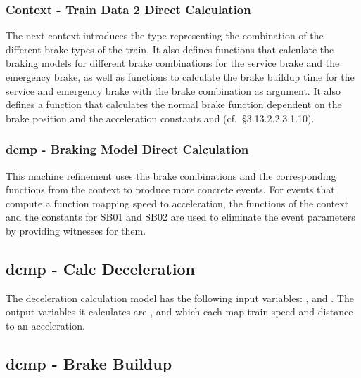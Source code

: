 \documentclass{template/openetcs_article}
\begin{document}
{\footnotesize

}

\subsubsection{Context - Train Data 2 Direct Calculation}
\label{sec:context-train-data-1}

The next context introduces the type representing the combination of the
different brake types of the train. It also defines functions that calculate the
braking models for different brake combinations for the service brake and the
emergency brake, as well as functions to calculate the brake buildup time for
the service and emergency brake with the brake combination as argument. It also
defines a function that calculates the normal brake function dependent on the
brake position and the acceleration constants  and
 (cf.~§3.13.2.2.3.1.10).

{\footnotesize

}

\subsubsection{dcmp - Braking Model Direct Calculation}
\label{sec:dcmp-braking-model-2}

This machine refinement uses the brake combinations and the corresponding
functions from the context to produce more concrete events. For events that
compute a function mapping speed to acceleration, the functions of the context
and the constants for SB01 and SB02 are used to eliminate the event parameters
by providing witnesses for them.

{\footnotesize

}

\subsection{dcmp - Calc Deceleration}
\label{sec:dcmp-calc-decel}

The deceleration calculation model has the following input variables:
,  and . The output
variables it calculates are ,  and
 which each map train speed and distance to an acceleration.

{\footnotesize

}

\subsection{dcmp - Brake Buildup}
\label{sec:dcmp-brake-buildup}
\end{document}
